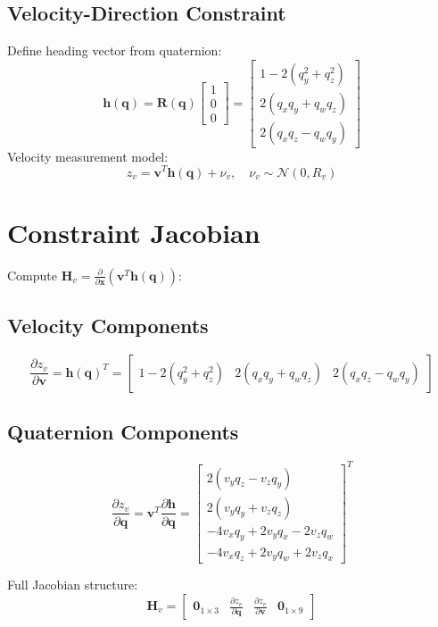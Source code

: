 \documentclass{article}
\begin{document}
	\subsection{Velocity-Direction Constraint}
	Define heading vector from quaternion:
	\[
	\mathbf{h}(\mathbf{q}) = \mathbf{R}(\mathbf{q})\begin{bmatrix}1\\0\\0\end{bmatrix} = \begin{bmatrix}
		1-2(q_y^2 + q_z^2) \\
		2(q_xq_y + q_wq_z) \\
		2(q_xq_z - q_wq_y)
	\end{bmatrix}
	\]
	Velocity measurement model:
	\[
	z_v = \mathbf{v}^T\mathbf{h}(\mathbf{q}) + \nu_v,\quad \nu_v \sim \mathcal{N}(0,R_v)
	\]

	\section{Constraint Jacobian}
	Compute $\mathbf{H}_v = \frac{\partial}{\partial\mathbf{x}}(\mathbf{v}^T\mathbf{h}(\mathbf{q}))$:

	\subsection{Velocity Components}
	\[
	\frac{\partial z_v}{\partial\mathbf{v}} = \mathbf{h}(\mathbf{q})^T = \begin{bmatrix}
		1-2(q_y^2+q_z^2) & 2(q_xq_y+q_wq_z) & 2(q_xq_z-q_wq_y)
	\end{bmatrix}
	\]

	\subsection{Quaternion Components}
	\[
	\frac{\partial z_v}{\partial\mathbf{q}} = \mathbf{v}^T\frac{\partial\mathbf{h}}{\partial\mathbf{q}} = \begin{bmatrix}
		2(v_yq_z - v_zq_y) \\
		2(v_yq_y + v_zq_z) \\
		-4v_xq_y + 2v_yq_x - 2v_zq_w \\
		-4v_xq_z + 2v_yq_w + 2v_zq_x
	\end{bmatrix}^T
	\]

	Full Jacobian structure:
	\[
	\mathbf{H}_v = \begin{bmatrix}
		\mathbf{0}_{1\times3} & \frac{\partial z_v}{\partial\mathbf{q}} & \frac{\partial z_v}{\partial\mathbf{v}} & \mathbf{0}_{1\times9}
	\end{bmatrix}
	\]
\end{document}
